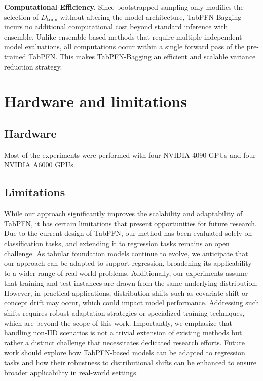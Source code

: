 \textbf{Computational Efficiency.} Since bootstrapped sampling only modifies the selection of \( D_{\text{train}} \) without altering the model architecture, TabPFN-Bagging incurs no additional computational cost beyond standard inference with ensemble. Unlike ensemble-based methods that require multiple independent model evaluations, all computations occur within a single forward pass of the pre-trained TabPFN. This makes TabPFN-Bagging an efficient and scalable variance reduction strategy.

\section{Hardware and limitations}
\label{appendix:limit}
\subsection{Hardware}
Most of the experiments were performed  with four NVIDIA 4090 GPUs and four NVIDIA A6000 GPUs.

\subsection{Limitations}
While our approach significantly improves the scalability and adaptability of TabPFN, it has certain limitations that present opportunities for future research. Due to the current design of TabPFN, our method has been evaluated solely on classification tasks, and extending it to regression tasks remains an open challenge. As tabular foundation models continue to evolve, we anticipate that our approach can be adapted to support regression, broadening its applicability to a wider range of real-world problems.
Additionally, our experiments assume that training and test instances are drawn from the same underlying distribution. However, in practical applications, distribution shifts such as covariate shift or concept drift may occur, which could impact model performance. Addressing such shifts requires robust adaptation strategies or specialized training techniques, which are beyond the scope of this work. Importantly, we emphasize that handling non-IID scenarios is not a trivial extension of existing methods but rather a distinct challenge that necessitates dedicated research efforts. Future work should explore how TabPFN-based models can be adapted to regression tasks and how their robustness to distributional shifts can be enhanced to ensure broader applicability in real-world settings.

